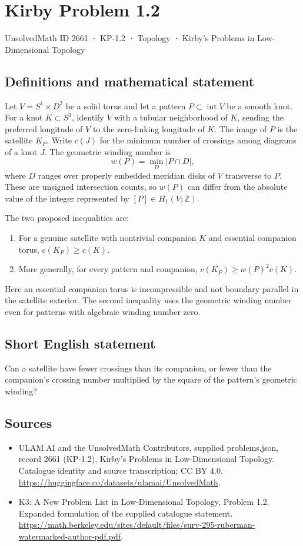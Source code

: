 \documentclass[11pt,a4paper]{article}
\begin{document}
\section*{Kirby Problem 1.2}\label{2661}
{\small UnsolvedMath ID 2661 · KP-1.2 · Topology · Kirby's Problems in Low-Dimensional Topology}
\subsection{Definitions and mathematical statement}
Let $V=S^1\times D^2$ be a solid torus and let a pattern $P\subset\operatorname{int}V$
be a smooth knot. For a knot $K\subset S^3$, identify $V$ with a tubular neighborhood
of $K$, sending the preferred longitude of $V$ to the zero-linking longitude of
$K$. The image of $P$ is the satellite $K_P$.
Write $c(J)$ for the minimum number of crossings among diagrams of a knot $J$.
The geometric winding number is
\[
w(P)=\min_D |P\cap D|,
\]
where $D$ ranges over properly embedded meridian disks of $V$ transverse to $P$.
These are unsigned intersection counts, so $w(P)$ can differ from the absolute
value of the integer represented by $[P]\in H_1(V;\mathbb Z)$.

The two proposed inequalities are:
\begin{enumerate}
\item For a genuine satellite with nontrivial companion $K$ and essential companion
torus, $c(K_P)\geq c(K)$.
\item More generally, for every pattern and companion,
$c(K_P)\geq w(P)^2c(K)$.
\end{enumerate}
Here an essential companion torus is incompressible and not boundary parallel in
the satellite exterior. The second inequality uses the geometric winding number
even for patterns with algebraic winding number zero.
\subsection{Short English statement}
Can a satellite have fewer crossings than its companion, or fewer than the companion's crossing number multiplied by the square of the pattern's geometric winding?
\subsection{Sources}
\begin{itemize}
\item[S1] ULAM.AI and the UnsolvedMath Contributors, supplied problems.json, record 2661 (KP-1.2), Kirby's Problems in Low-Dimensional Topology. Catalogue identity and source transcription; CC BY 4.0.
\url{https://huggingface.co/datasets/ulamai/UnsolvedMath}.
\item[S2] K3: A New Problem List in Low-Dimensional Topology, Problem 1.2. Expanded formulation of the supplied catalogue statement.
\url{https://math.berkeley.edu/sites/default/files/surv-295-ruberman-watermarked-author-pdf.pdf}.
\end{itemize}
\end{document}
